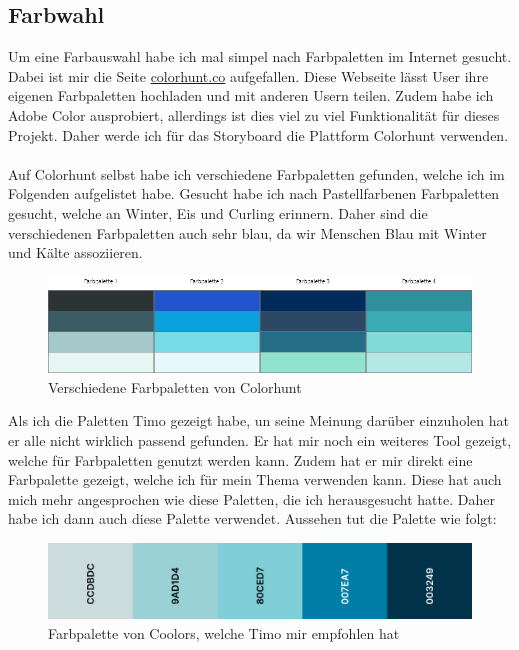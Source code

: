 \documentclass[11pt]{article}
\begin{document}
    \subsection{Farbwahl}
    Um eine Farbauswahl habe ich mal simpel nach Farbpaletten im Internet gesucht. Dabei ist mir die Seite
    \url{colorhunt.co} aufgefallen. Diese Webseite lässt User ihre eigenen Farbpaletten hochladen und mit
    anderen Usern teilen. Zudem habe ich Adobe Color ausprobiert, allerdings ist dies viel zu viel
    Funktionalität für dieses Projekt. Daher werde ich für das Storyboard die Plattform Colorhunt verwenden.\\
    \\
    Auf Colorhunt selbst habe ich verschiedene Farbpaletten gefunden, welche ich im Folgenden aufgelistet
    habe. Gesucht habe ich nach Pastellfarbenen Farbpaletten gesucht, welche an Winter, Eis und Curling erinnern.
    Daher sind die verschiedenen Farbpaletten auch sehr blau, da wir Menschen Blau mit Winter und Kälte
    assoziieren.

    \begin{figure}[h]
        \includegraphics[width=\textwidth]{media/color_palettes}
        \caption{Verschiedene Farbpaletten von Colorhunt}
    \end{figure}

    Als ich die Paletten Timo gezeigt habe, un seine Meinung darüber einzuholen hat er alle nicht wirklich passend
    gefunden. Er hat mir noch ein weiteres Tool gezeigt, welche für Farbpaletten genutzt werden kann. Zudem hat er
    mir direkt eine Farbpalette gezeigt, welche ich für mein Thema verwenden kann. Diese hat auch mich mehr
    angesprochen wie diese Paletten, die ich herausgesucht hatte. Daher habe ich dann auch diese Palette verwendet.
    Aussehen tut die Palette wie folgt:

    \begin{figure}[h]
        \includegraphics[width=\textwidth]{media/color_palette}
        \caption{Farbpalette von Coolors, welche Timo mir empfohlen hat}
    \end{figure}
\end{document}
